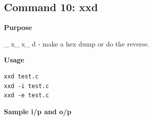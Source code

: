 \subsection{Command 10: xxd} 
\textbf{Purpose}
\begin{flushleft}
       _x_x_d - make a hex dump or do the reverse.
\end{flushleft}
\textbf{Usage}
\begin{verbatim}
xxd test.c
xxd -i test.c
xxd -e test.c
\end{verbatim}
\textbf{Sample i/p and o/p}
\begin{figure}[H] 
\end{figure}
